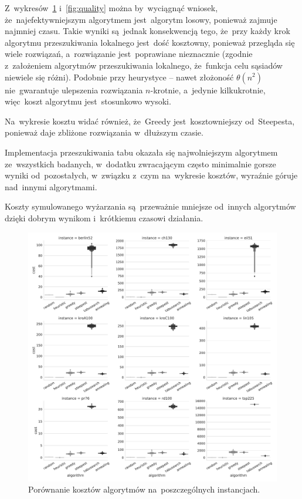 Z~wykresów~\ref{fig:cost} i~\ref{fig:quality} można by~wyciągnąć wniosek, że~najefektywniejszym algorytmem jest~algorytm losowy, ponieważ zajmuje najmniej czasu. Takie wyniki są~jednak konsekwencją tego, że~przy każdy krok algorytmu przeszukiwania lokalnego jest~dość kosztowny, ponieważ przegląda się wiele rozwiązań, a~rozwiązanie jest~poprawiane nieznacznie (zgodnie z~założeniem algorytmów przeszukiwania lokalnego, że~funkcja celu sąsiadów niewiele się różni). Podobnie przy heurystyce -- nawet złożoność $\theta(n^2)$ nie~gwarantuje ulepszenia rozwiązania $n$-krotnie, a~jedynie kilkukrotnie, więc~koszt algorytmu jest~stosunkowo wysoki.

Na~wykresie kosztu widać również, że~Greedy jest~kosztowniejszy od~Steepesta, ponieważ daje zbliżone rozwiązania w~dłuższym czasie.

{\color{part2}
Implementacja przeszukiwania tabu okazała się najwolniejszym algorytmem ze~wszystkich badanych, w~dodatku zwracającym często minimalnie gorsze wyniki od~pozostałych, w~związku z~czym na~wykresie kosztów, wyraźnie góruje nad~innymi algorytmami.

Koszty symulowanego wyżarzania są~przeważnie mniejsze od~innych algorytmów dzięki dobrym wynikom i~krótkiemu czasowi działania.
}

\begin{figure}[H]
\begin{center}
\includegraphics[width=1.0\textwidth]{graphs/cost_comparison_letval.pdf}
\end{center}
\caption{Porównanie kosztów algorytmów na~poszczególnych instancjach.}
\label{fig:cost}
\end{figure}

